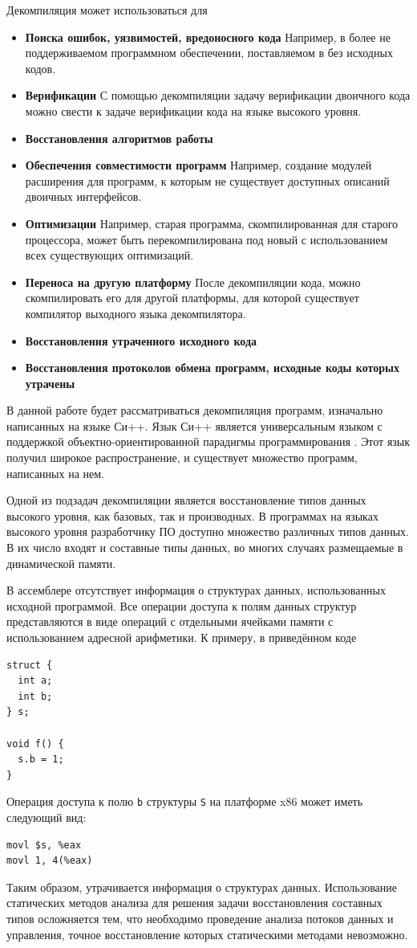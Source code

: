 \documentclass[a4paper,12pt,russian]{article}
\begin{document}
Декомпиляция может использоваться для
\begin{itemize}
\item{\textbf{Поиска ошибок, уязвимостей, вредоносного кода}} Например, в более не поддерживаемом программном обеспечении, поставляемом в без исходных кодов.
\item{\textbf{Верификации}} С помощью декомпиляции задачу верификации двоичного кода можно свести к задаче верификации кода на языке высокого уровня.
\item{\textbf{Восстановления алгоритмов работы}}
\item{\textbf{Обеспечения совместимости программ}} Например, создание модулей расширения для программ, к которым не существует доступных описаний двоичных интерфейсов.
\item{\textbf{Оптимизации}} Например, старая программа, скомпилированная для старого процессора, может быть перекомпилирована под новый с использованием всех существующих оптимизаций.
\item{\textbf{Переноса на другую платформу}} После декомпиляции кода, можно скомпилировать его для другой платформы, для которой существует компилятор выходного языка декомпилятора.
\item{\textbf{Восстановления утраченного исходного кода}}
\item{\textbf{Восстановления протоколов обмена программ, исходные коды которых утрачены}}
\end{itemize}

В данной работе будет рассматриваться декомпиляция программ, изначально написанных на языке Си++.
Язык Си++ является универсальным языком с поддержкой объектно-ориентированной парадигмы программирования \cite{strstr}. Этот язык получил широкое распространение, и существует множество программ, написанных на нем.

Одной из подзадач декомпиляции является восстановление типов данных высокого уровня, как базовых, так и производных.
В программах на языках высокого уровня разработчику ПО доступно множество различных типов данных.
В их число входят и составные типы данных, во многих случаях размещаемые в динамической памяти.

В ассемблере отсутствует информация о структурах данных, использованных исходной программой.
Все операции доступа к полям данных структур представляются в виде операций с отдельными ячейками памяти с использованием адресной арифметики.
К примеру, в приведённом коде
\begin{lstlisting}
struct {
  int a;
  int b;
} s;

void f() {
  s.b = 1;
}
\end{lstlisting}
Операция доступа к полю \texttt{b} структуры \texttt{S} на платформе x86 может иметь следующий вид:
\begin{lstlisting}[language={[x86masm]Assembler}]
movl $s, %eax
movl 1, 4(%eax)
\end{lstlisting}
Таким образом, утрачивается информация о структурах данных.
Использование статических методов анализа для решения задачи восстановления составных типов осложняется тем, что необходимо проведение анализа потоков данных и управления, точное восстановление которых статическими методами невозможно.
\end{document}
